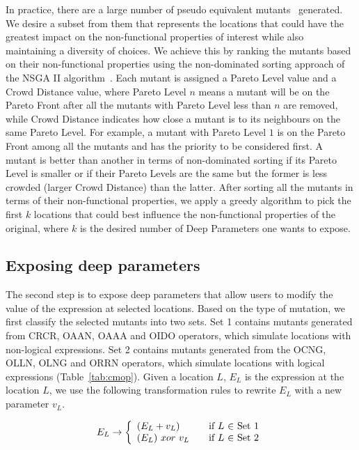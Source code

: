 In practice, there are a large number of pseudo equivalent mutants~\cite{5477100, weimerGPEM14} generated. We desire a subset from them that represents the locations that could have the greatest impact on the non-functional properties of interest while also maintaining a diversity of choices.  
We achieve this by ranking the mutants based on their non-functional properties using the non-dominated sorting approach of the NSGA II algorithm~\cite{996017}. Each mutant is assigned a Pareto Level value and a Crowd Distance value, where Pareto Level $n$ means a mutant will be on the Pareto Front after all the mutants with Pareto Level less than $n$ are removed, while Crowd Distance indicates how close a mutant is to its neighbours on the same Pareto Level. For example, a mutant with Pareto Level $1$ is on the Pareto Front among all the mutants and has the priority to be considered first. A mutant is better than another in terms of non-dominated sorting if its Pareto Level is smaller or if their Pareto Levels are the same but the former is less crowded (larger Crowd Distance) than the latter. After sorting all the mutants in terms of their non-functional properties, we apply a greedy algorithm to pick the first $k$ locations that could best influence the non-functional properties of the original, where $k$ is the desired number of Deep Parameters one wants to expose.

\subsection{Exposing deep parameters}
\label{exposing}
The second step is to expose deep parameters that allow users to modify the value of the expression at selected locations. Based on the type of mutation, we first classify the selected mutants into two sets. Set 1 contains mutants generated from CRCR, OAAN, OAAA and OIDO operators, which simulate locations with non-logical expressions. Set 2 contains mutants generated from the OCNG, OLLN, OLNG and ORRN operators, which simulate locations with logical expressions (Table~\ref{tab:cmop}). 
Given a location $L$, $E_L$ is the expression at the location $L$, we use the following transformation rules to rewrite $E_L$ with a new parameter $v_L$.

\begin{equation}
 E_L \rightarrow \left\{
  \begin{array}{l l}
    (E_L + v_L) & \quad \text{if $L$ $\in$ Set 1}\\
    (E_L) \ xor \ v_L & \quad \text{if $L$ $\in$ Set 2}
    \end{array} \right.
\end{equation}

